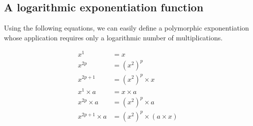 












\subsection{A logarithmic exponentiation  function}

Using the following equations, we can easily define a polymorphic exponentiation whose application requires only a logarithmic number of multiplications. 

\begin{align}
x^1 &= x \label{binary-eq1}\\
x^{2p} &= (x^2)^p \label{binary-eq2}\\
x^{2p+1} &= (x^2)^p \times x \label{binary-eq3}\\
x^1 \times a &= x \times a \label{binary-eq4}\\
x^{2p} \times a  &= (x^2)^p \times a\label{binary-eq5}\\
x^{2p+1} \times a  &= (x^2)^p \times (a\times x)\label{binary-eq6}
\end{align}


